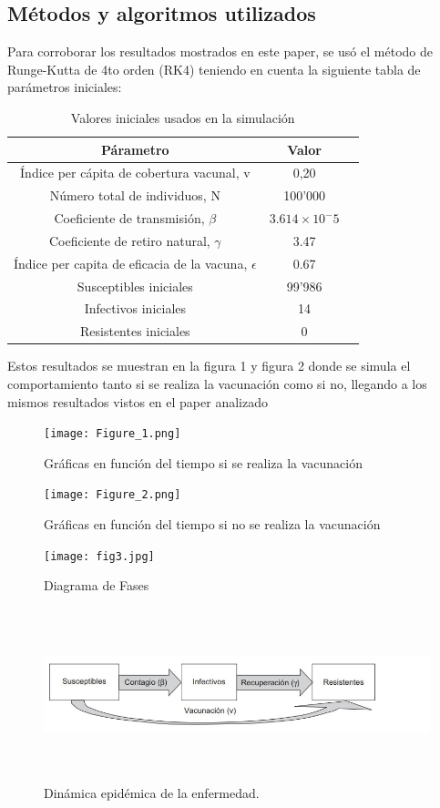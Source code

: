 \documentclass{wscpaperproc}
\theoremstyle{wsc}
\begin{document}
\subsection[short]{M\'etodos y algoritmos utilizados}

Para corroborar los resultados mostrados en este paper,
se us\'o el m\'etodo de Runge-Kutta de 4to orden (RK4)
teniendo en cuenta la siguiente tabla de par\'ametros iniciales:


\begin{table}[htbp]
  \centering
  \caption{Valores iniciales usados en la simulación}
  \label{tabla-ejemplo}
  \begin{tabular}{|c|c|c|}
    \hline
    \textbf{Párametro} & \textbf{Valor} \\
    \hline
    Índice per cápita de cobertura vacunal, v & 0,20 \\
    Número total de individuos, N & 100'000\\
	Coeficiente de transmisión, $\beta$ & $ 3.614\times10^-5$\\
	Coeficiente de retiro natural, $\gamma$ & 3.47\\
	Índice per capita de eficacia de la vacuna, $\epsilon$ & 0.67\\
	Susceptibles iniciales &99'986\\
	Infectivos iniciales & 14\\
	Resistentes iniciales & 0\\
    \hline
  \end{tabular}
\end{table}

Estos resultados se muestran en la figura 1 y figura 2 donde se simula
el comportamiento tanto si se realiza la vacunación como si no, llegando
a los mismos resultados vistos en el paper analizado

\begin{figure}
	\centering
	\texttt{[image: Figure\_1.png]}
	\caption{Gráficas en función del tiempo si se realiza la vacunación}

	\centering
	\texttt{[image: Figure\_2.png]}
	\caption{Gráficas en función del tiempo si no se realiza la vacunación}\centering
  \end{figure}

\newpage

\begin{figure}
	\texttt{[image: fig3.jpg]}
	\caption{Diagrama de Fases }
\end{figure}

\begin{figure}
	\centering
	\includegraphics[width=1.0\textwidth,height=5cm]{fig4.jpg}
	\caption{Dinámica epidémica de la enfermedad.}
\end{figure}
\end{document}
